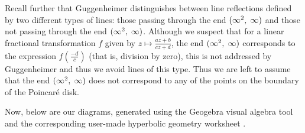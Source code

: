 \documentclass[12pt]{article}
\newcommand{\ttc}{, \hspace{1mm}}
\newcommand{\poincare}{Poincar\'{e} }
\newcommand{\specialend}{(\infty^2\ttc\infty)}
\theoremstyle{plain}
\theoremstyle{definition}
\begin{document}
Recall further that Guggenheimer distinguishes between line reflections defined by two different types of lines: those passing through the end $\specialend$ and those not passing through the end $\specialend$. Although we suspect that for a linear fractional transformation $f$ given by $z \mapsto \frac{az+b}{cz+d}$, the end $\specialend$ corresponds to the expression $f(\frac{-d}{c})$ (that is, division by zero), this is not addressed by Guggenheimer and thus we avoid lines of this type. Thus we are left to assume that the end $\specialend$ does not correspond to any of the points on the boundary of the \poincare disk. 

Now, below are our diagrams, generated using the Geogebra visual algebra tool \cite{geogebra_software} and the corresponding user-made hyperbolic geometry worksheet \cite{hyperbolic_worksheet}.
\end{document}

